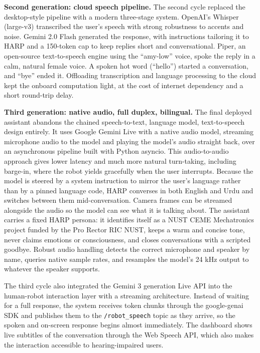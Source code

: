 \documentclass[11pt,a4paper]{article}
\begin{document}
\textbf{Second generation: cloud speech pipeline.} The second cycle replaced the desktop-style pipeline with a modern three-stage system. OpenAI's Whisper (large-v3) transcribed the user's speech with strong robustness to accents and noise. Gemini 2.0 Flash generated the response, with instructions tailoring it to HARP and a 150-token cap to keep replies short and conversational. Piper, an open-source text-to-speech engine using the ``amy-low'' voice, spoke the reply in a calm, natural female voice. A spoken hot word (``hello'') started a conversation, and ``bye'' ended it. Offloading transcription and language processing to the cloud kept the onboard computation light, at the cost of internet dependency and a short round-trip delay.

\textbf{Third generation: native audio, full duplex, bilingual.} The final deployed assistant abandons the chained speech-to-text, language model, text-to-speech design entirely. It uses Google Gemini Live with a native audio model, streaming microphone audio to the model and playing the model's audio straight back, over an asynchronous pipeline built with Python asyncio. This audio-to-audio approach gives lower latency and much more natural turn-taking, including barge-in, where the robot yields gracefully when the user interrupts. Because the model is steered by a system instruction to mirror the user's language rather than by a pinned language code, HARP converses in both English and Urdu and switches between them mid-conversation. Camera frames can be streamed alongside the audio so the model can see what it is talking about. The assistant carries a fixed HARP persona: it identifies itself as a NUST CEME Mechatronics project funded by the Pro Rector RIC NUST, keeps a warm and concise tone, never claims emotions or consciousness, and closes conversations with a scripted goodbye. Robust audio handling detects the correct microphone and speaker by name, queries native sample rates, and resamples the model's 24 kHz output to whatever the speaker supports.

The third cycle also integrated the Gemini 3 generation Live API into the human-robot interaction layer with a streaming architecture. Instead of waiting for a full response, the system receives token chunks through the google-genai SDK and publishes them to the \texttt{/robot\_speech} topic as they arrive, so the spoken and on-screen response begins almost immediately. The dashboard shows live subtitles of the conversation through the Web Speech API, which also makes the interaction accessible to hearing-impaired users.
\end{document}
